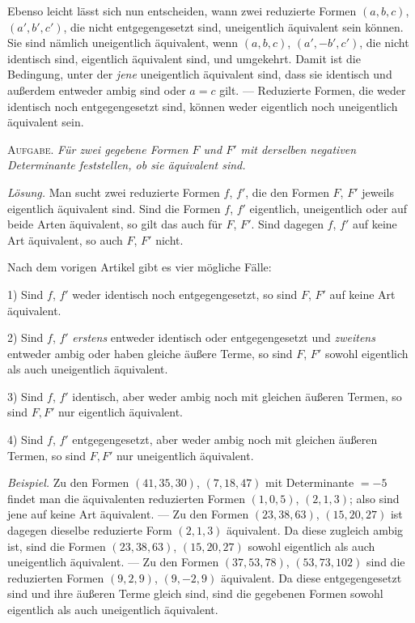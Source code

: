 Ebenso leicht lässt sich nun entscheiden, wann zwei reduzierte Formen $(a,b,c)$, $(a',b',c')$, die nicht entgegengesetzt sind, uneigentlich äquivalent sein können. Sie sind nämlich uneigentlich äquivalent, wenn $(a,b,c)$, $(a',-b',c')$, die nicht identisch sind, eigentlich äquivalent sind, und umgekehrt. Damit ist die Bedingung, unter der \emph{jene} uneigentlich äquivalent sind, dass sie identisch und außerdem entweder ambig sind oder $a=c$ gilt. --- Reduzierte Formen, die weder identisch noch entgegengesetzt sind, können weder eigentlich noch uneigentlich äquivalent sein.

\textsc{Aufgabe.} \emph{Für zwei gegebene Formen $F$ und $F'$ mit derselben negativen Determinante feststellen, ob sie äquivalent sind.}

\emph{Lösung.} Man sucht zwei reduzierte Formen $f$, $f'$, die den Formen $F$, $F'$ jeweils eigentlich äquivalent sind. Sind die Formen $f$, $f'$ eigentlich, uneigentlich oder auf beide Arten äquivalent, so gilt das auch für $F$, $F'$. Sind dagegen $f$, $f'$ auf keine Art äquivalent, so auch $F$, $F'$ nicht.

Nach dem vorigen Artikel gibt es vier mögliche Fälle:

1) Sind $f$, $f'$ weder identisch noch entgegengesetzt, so sind $F$, $F'$ auf keine Art äquivalent.

2) Sind $f$, $f'$ \emph{erstens} entweder identisch oder entgegengesetzt und \emph{zweitens} entweder ambig oder haben gleiche äußere Terme, so sind $F$, $F'$ sowohl eigentlich als auch uneigentlich äquivalent.

3) Sind $f$, $f'$ identisch, aber weder ambig noch mit gleichen äußeren Termen, so sind $F,F'$ nur eigentlich äquivalent.

4) Sind $f$, $f'$ entgegengesetzt, aber weder ambig noch mit gleichen äußeren Termen, so sind $F,F'$ nur uneigentlich äquivalent.

\emph{Beispiel.} Zu den Formen $(41,35,30)$, $(7,18,47)$ mit Determinante $=-5$ findet man die äquivalenten reduzierten Formen $(1,0,5)$, $(2,1,3)$; also sind jene auf keine Art äquivalent. --- Zu den Formen $(23,38,63)$, $(15,20,27)$ ist dagegen dieselbe reduzierte
Form $(2,1,3)$ äquivalent. Da diese zugleich ambig ist, sind die Formen $(23,38,63)$, $(15,20,27)$ sowohl eigentlich als auch uneigentlich äquivalent. --- Zu den Formen $(37,53,78)$, $(53,73,102)$ sind die reduzierten Formen $(9,2,9)$, $(9,-2,9)$ äquivalent. Da diese entgegengesetzt sind und ihre äußeren Terme gleich sind, sind die gegebenen Formen sowohl eigentlich als auch uneigentlich äquivalent.

